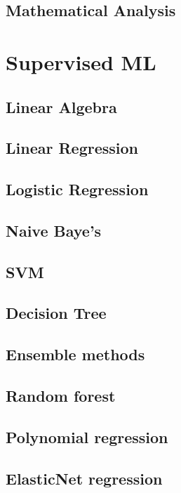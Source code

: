 \documentclass[11pt,fleqn]{book} %
\begin{document}
\chapter{Mathematical Analysis}
\part{Supervised ML}
\chapter{Linear Algebra}
\chapter{Linear Regression}
\chapter{Logistic Regression}
\chapter{Naive Baye's}
\chapter{SVM}
\chapter{Decision Tree}
\chapter{Ensemble methods}
\chapter{Random forest}
\chapter{Polynomial regression}
\chapter{ElasticNet regression}
\end{document}
